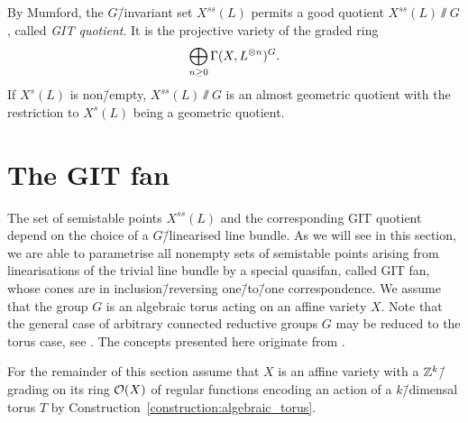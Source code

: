 \begin{remark}
	\label{remark:semistable_points_yield_git_quotient}
	By Mumford, the $G$\=/invariant set $X^{ss}(L)$ permits a good quotient $X^{ss}(L)\sslash G$, called \emph{GIT quotient}. It is the projective variety of the graded ring
	$$\bigoplus_{n\geq 0} \Gamma(X,L^{\otimes n})^G.$$
	If  $X^{s}(L)$ is non\=/empty, $X^{ss}(L)\sslash G$ is an almost geometric quotient with the restriction to $X^{s}(L)$ being a geometric quotient.
\end{remark}

\section{The GIT fan}

The set of semistable points $X^{ss}(L)$ and the corresponding GIT quotient depend on the choice of a $G$\=/linearised line bundle. As we will see in this section, we are able to parametrise all nonempty sets of semistable points arising from linearisations of the trivial line bundle by a special quasifan, called GIT fan, whose cones are in inclusion\=/reversing one\=/to\=/one correspondence. We assume that the group $G$ is an algebraic torus acting on an affine variety $X$. Note that the general case of arbitrary connected reductive groups $G$ may be reduced to the torus case, see \cite[Lemma 3.3]{git_via_cox_rings}. The concepts presented here originate from \cite[chapter 2]{git_equivalence}.

For the remainder of this section assume that $X$ is an affine variety with a $\mathbb{Z}^k$\=/grading on its ring $\mathcal{O}(X)$ of regular functions encoding an action of a $k$\=/dimensal torus $T$ by Construction~\ref{construction:algebraic_torus}.


